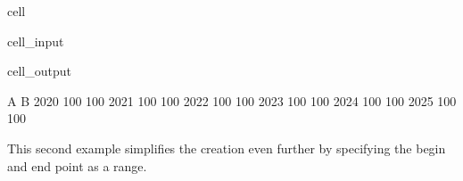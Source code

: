 \documentclass[letterpaper,10pt,english]{jupyterBook}
\begin{document}
\begin{sphinxuseclass}{cell}\begin{sphinxVerbatimInput}

\begin{sphinxuseclass}{cell_input}
\begin{sphinxVerbatim}[commandchars=\\\{\}]
   

  
       \PYG{p}{[}    \PYG{p}{]} 
       \PYG{p}{[}\PYG{p}{]}                                 
\end{sphinxVerbatim}

\end{sphinxuseclass}\end{sphinxVerbatimInput}
\begin{sphinxVerbatimOutput}

\begin{sphinxuseclass}{cell_output}
\begin{sphinxVerbatim}[commandchars=\\\{\}]
        A    B
2020  100  100
2021  100  100
2022  100  100
2023  100  100
2024  100  100
2025  100  100
\end{sphinxVerbatim}

\end{sphinxuseclass}\end{sphinxVerbatimOutput}

\end{sphinxuseclass}
\sphinxAtStartPar
This second example simplifies the creation even further by  specifying the begin and end point as a range.
\end{document}

